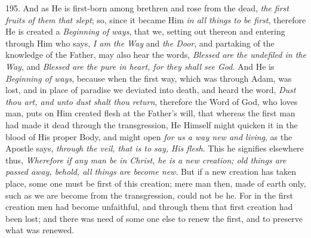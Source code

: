 195. And as He is first-born
among brethren and rose from the dead, \emph{the first fruits of them
that slept}; so, since it became Him \emph{in all things to be first},
therefore He is created a \emph{Beginning of ways}, that we, setting
out thereon and entering through Him who says, \emph{I am the Way} and
\emph{the Door}, and partaking of the knowledge of the Father,
may also hear the words, \emph{Blessed are the undefiled in the Way},
and \emph{Blessed are the pure in heart, for they shall see God}. And
He is \emph{Beginning of ways}, because when the first way, which was
through Adam, was lost, and in place of paradise we deviated into
death, and heard the word, \emph{Dust thou art, and unto dust shalt thou
return}, therefore the Word of God, who loves man, puts on Him
created flesh at the Father's will, that whereas the first man had
made it dead through the transgression, He Himself might quicken it in
the blood of His proper Body, and might open \emph{for us a way new and
living}, as the Apostle says, \emph{through the veil, that is to say,}
\emph{His flesh}. This he signifies elsewhere thus, \emph{Wherefore if
any man be in Christ, he is a new creation; old things are passed
away, behold, all things are become new}. But if a new creation has
taken place, some one must be first of this creation; mere man then,
made of earth only, such as we are become from the transgression,
could not be he. For in the first creation men had become unfaithful,
and through them that first creation had been lost; and there was need
of some one else to renew the first, and to preserve what was renewed.

